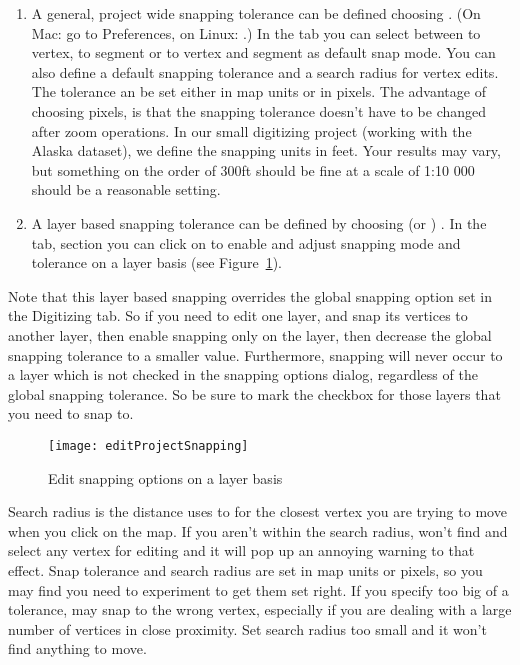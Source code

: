 \begin{enumerate}
\item A general, project wide snapping tolerance can be defined choosing
 \arrow {}.
(On Mac: go to  \mainmenuopt{\qg} \arrow Preferences, on Linux:  \arrow {}.)
In the  tab you can select between to vertex, to segment or
to vertex and segment as default snap mode. You can also define a default
snapping tolerance and a search radius for vertex edits. The tolerance an be
set either in map units or in pixels. The advantage of choosing pixels, is
that the snapping tolerance doesn't have to be changed after zoom operations.
In our small digitizing project (working with the Alaska dataset), we define
the snapping units in feet. Your results may vary, but something on the order
of 300ft should be fine at a scale of 1:10 000 should be a reasonable
setting.
\item A layer based snapping tolerance can be defined by choosing
 (or ) \arrow {}. In the  tab, section  you
can click on  to enable and adjust snapping
mode and tolerance on a layer basis (see Figure~\ref{fig:snappingoptions}).
\end{enumerate}
Note that this layer based snapping overrides the global snapping option set in the Digitizing tab. So if you need to edit one layer, and snap its vertices to another layer, then enable snapping only on the  layer, then decrease the global snapping tolerance to a smaller value.  Furthermore, snapping will never occur to a layer which is not checked in the snapping options dialog, regardless of the global snapping tolerance. So be sure to mark the checkbox for those layers that you need to snap to.

\begin{figure}[ht]
   \centering
   \texttt{[image: editProjectSnapping]}
   \caption{Edit snapping options on a layer basis \nixcaption}\label{fig:snappingoptions}
\end{figure}


Search radius is the distance \qg uses to  for the closest
vertex you are trying to move when you click on the
map. If you aren't within the search radius, \qg won't find and select
any vertex for editing and it will pop up an annoying warning to that effect.
Snap tolerance and search radius are set in map units or pixels, so you may find you
need to experiment to get them set right. If you specify too big of a
tolerance, \qg may snap to the wrong vertex, especially if you are dealing
with a large number of vertices in close proximity. Set search radius too
small and it won't find anything to move.

